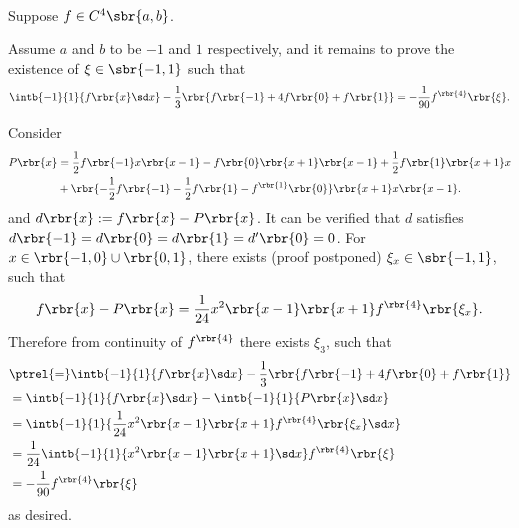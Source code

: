 \documentclass[english, nochinese]{../textmpls/pkupaper}
\title{\titlemark}
\author{\authoring}
\begin{document}
\maketitle

\begin{thmquestion}
\ 
\begin{thmproof}
Suppose $ f \in C^4 \sbr{ a, b } $.

Assume $a$ and $b$ to be $-1$ and $1$ respectively, and it remains to prove the existence of $ \xi \in \sbr{ -1, 1 } $ such that
\begin{equation}
\intb{-1}{1}{ f \rbr{x} \sd x } - \frac{1}{3} \rbr{ f \rbr{-1} + 4 f \rbr{0} + f \rbr{1} } = - \frac{1}{90} f^{\rbr{4}} \rbr{\xi}.
\end{equation}

Consider
\begin{equation}
\begin{split}
P \rbr{x} &= \frac{1}{2} f \rbr{-1} x \rbr{ x - 1 } - f \rbr{0} \rbr{ x + 1 } \rbr{ x - 1 } + \frac{1}{2} f \rbr{1} \rbr{ x + 1 } x \\
&+ \rbr{ -\frac{1}{2} f \rbr{-1} - \frac{1}{2} f \rbr{1} - f^{\rbr{1}} \rbr{0} } \rbr{ x + 1 } x \rbr{ x - 1 }.
\end{split}
\end{equation}
and $ d \rbr{x} := f \rbr{x} - P \rbr{x} $. It can be verified that $d$ satisfies $ d \rbr{-1} = d \rbr{0} = d \rbr{1} = d' \rbr{0} = 0 $. For $ x \in \rbr{ -1, 0 } \cup \rbr{ 0, 1 } $, there exists (proof postponed) $ \xi_x \in \sbr{ -1, 1 } $, such that
\begin{equation}
f \rbr{x} - P \rbr{x} = \frac{1}{24} x^2 \rbr{ x - 1 } \rbr{ x + 1 } f^{\rbr{4}} \rbr{\xi_x}.
\end{equation}
Therefore from continuity of $ f^{\rbr{4}} $ there exists $\xi_3$, such that
\begin{equation}
\begin{split}
&\ptrel{=} \intb{-1}{1}{ f \rbr{x} \sd x } - \frac{1}{3} \rbr{ f \rbr{-1} + 4 f \rbr{0} + f \rbr{1} } \\
&= \intb{-1}{1}{ f \rbr{x} \sd x } - \intb{-1}{1}{ P \rbr{x} \sd x } \\
&= \intb{-1}{1}{ \frac{1}{24} x^2 \rbr{ x - 1 } \rbr{ x + 1 } f^{\rbr{4}} \rbr{\xi_x} \sd x } \\
&= \frac{1}{24} \intb{-1}{1}{ x^2 \rbr{ x - 1 } \rbr{ x + 1 } \sd x } f^{\rbr{4}} \rbr{\xi} \\
&= -\frac{1}{90} f^{\rbr{4}} \rbr{\xi}
\end{split}
\end{equation}
as desired.


\end{thmproof}
\end{thmquestion}
\end{document}
